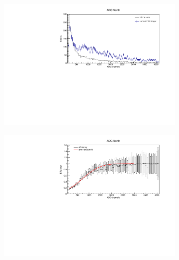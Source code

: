 \begin{figure}[ht]
  \centering
  \begin{subfigure}{0.7\linewidth}
    \includegraphics[width=\linewidth{}]{./fig/M6AdcNorth2Histo.pdf}
    \caption{}
    \label{fig:2HistoM6}
  \end{subfigure}
  \begin{subfigure}{0.7\linewidth}
    \includegraphics[width=\linewidth{}]{./fig/M6AdcNortheff_late.pdf}
    \caption{}
    \label{fig:eff_lateM6}
  \end{subfigure}
\end{figure}
